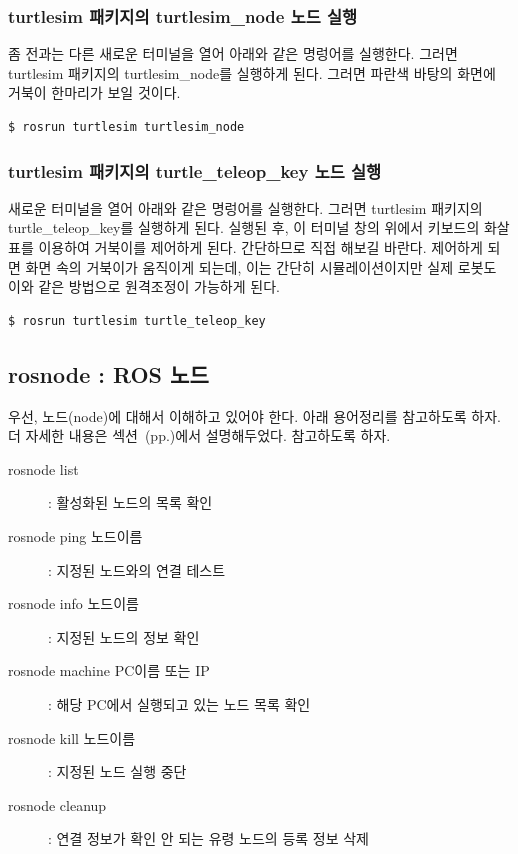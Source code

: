 \subsubsection{turtlesim 패키지의 turtlesim\_node 노드 실행}

좀 전과는 다른 새로운 터미널을 열어 아래와 같은 명렁어를 실행한다. 그러면 turtlesim 패키지의 turtlesim\_node를 실행하게 된다. 그러면 파란색 바탕의 화면에 거북이 한마리가 보일 것이다.

\begin{lstlisting}[language=bash]
$ rosrun turtlesim turtlesim_node 
\end{lstlisting}

\subsubsection{turtlesim 패키지의 turtle\_teleop\_key 노드 실행}

새로운 터미널을 열어 아래와 같은 명렁어를 실행한다. 그러면 turtlesim 패키지의 turtle\_teleop\_key를 실행하게 된다. 실행된 후, 이 터미널 창의 위에서 키보드의 화살표를 이용하여 거북이를 제어하게 된다. 간단하므로 직접 해보길 바란다. 제어하게 되면 화면 속의 거북이가 움직이게 되는데, 이는 간단히 시뮬레이션이지만 실제 로봇도 이와 같은 방법으로 원격조정이 가능하게 된다.

\begin{lstlisting}[language=bash]
$ rosrun turtlesim turtle_teleop_key
\end{lstlisting}

\subsection{rosnode : ROS 노드}

우선, 노드(node)에 대해서 이해하고 있어야 한다. 아래 용어정리를 참고하도록 하자. 더 자세한 내용은 섹션~(pp.\pageref{def:RosNode})에서 설명해두었다. 참고하도록 하자.

\vspace{\baselineskip}
\noindent
\begin{description}
\item[rosnode list] : 활성화된 노드의 목록 확인
\item[rosnode ping 노드이름] : 지정된 노드와의 연결 테스트
\item[rosnode info 노드이름] : 지정된 노드의 정보 확인
\item[rosnode machine PC이름 또는 IP] : 해당 PC에서 실행되고 있는 노드 목록 확인
\item[rosnode kill 노드이름] : 지정된 노드 실행 중단
\item[rosnode cleanup] : 연결 정보가 확인 안 되는 유령 노드의 등록 정보 삭제
\end{description}

